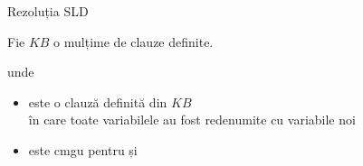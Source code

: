 \documentclass[xcolor=pdftex,romanian,colorlinks]{beamer}
\begin{document}
\begin{frame}{Rezoluția SLD}
 
\vspace{.2cm}
Fie $KB$ o mulțime de clauze definite.

\medskip
\begin{center}

\end{center}
\vspace{-.2cm}
unde 
\begin{itemize}
	\item {} este o clauză definită din $KB$\\
	 în care toate variabilele au fost redenumite cu variabile noi

	\item \intens{ $\theta$} este cmgu pentru  și 

\end{itemize}
\end{frame}
\end{document}
